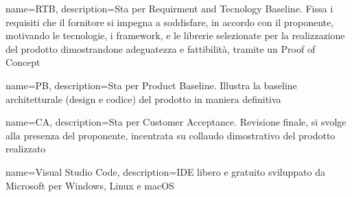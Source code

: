 {
	name={RTB},
	description={Sta per Requirment and Tecnology Baseline. Fissa i requisiti che il fornitore si impegna a soddisfare, in accordo con il proponente, motivando le tecnologie, i framework, e le librerie selezionate per la realizzazione del prodotto dimostrandone adeguatezza e fattibilità, tramite un Proof of Concept}
}

{
	name={PB},
	description={Sta per Product Baseline. Illustra la baseline architetturale (design e codice) del prodotto in maniera definitiva}
}

{
	name={CA},
	description={Sta per Customer Acceptance. Revisione finale, si svolge alla presenza del proponente, incentrata su collaudo dimostrativo del prodotto realizzato}
}

{
	name={Visual Studio Code},
	description={IDE\glo{} libero e gratuito sviluppato da Microsoft per Windows, Linux e macOS}
}

